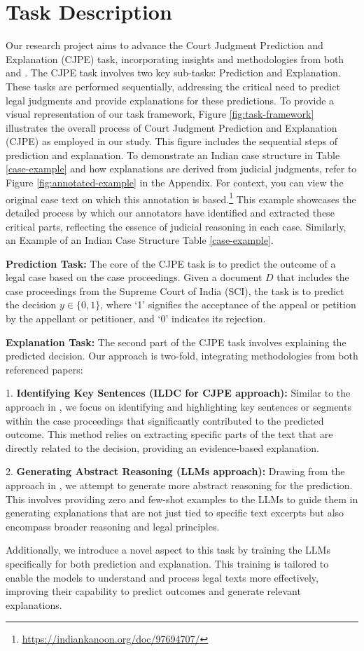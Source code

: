 \section{Task Description}
Our research project aims to advance the Court Judgment Prediction and Explanation (CJPE) task, incorporating insights and methodologies from both \cite{malik-etal-2021-ildc} and \cite{vats-etal-2023-llms}. The CJPE task involves two key sub-tasks: Prediction and Explanation. These tasks are performed sequentially, addressing the critical need to predict legal judgments and provide explanations for these predictions. To provide a visual representation of our task framework, Figure \ref{fig:task-framework} illustrates the overall process of Court Judgment Prediction and Explanation (CJPE) as employed in our study. This figure includes the sequential steps of prediction and explanation. To demonstrate an Indian case structure in Table \ref{case-example} and how explanations are derived from judicial judgments, refer to Figure \ref{fig:annotated-example} in the Appendix. For context, you can view the original case text on which this annotation is based.\footnote{\url{https://indiankanoon.org/doc/97694707/}} This example showcases the detailed process by which our annotators have identified and extracted these critical parts, reflecting the essence of judicial reasoning in each case. Similarly, an Example of an Indian Case Structure Table \ref{case-example}.

\textbf{Prediction Task:} The core of the CJPE task is to predict the outcome of a legal case based on the case proceedings. Given a document \(D\) that includes the case proceedings from the Supreme Court of India (SCI), the task is to predict the decision \(y \in \{0, 1\}\), where `1' signifies the acceptance of the appeal or petition by the appellant or petitioner, and `0' indicates its rejection.

\textbf{Explanation Task:} The second part of the CJPE task involves explaining the predicted decision. Our approach is two-fold, integrating methodologies from both referenced papers:

1. \textbf{Identifying Key Sentences (ILDC for CJPE approach):} Similar to the approach in \cite{malik-etal-2021-ildc}, we focus on identifying and highlighting key sentences or segments within the case proceedings that significantly contributed to the predicted outcome. This method relies on extracting specific parts of the text that are directly related to the decision, providing an evidence-based explanation.

2. \textbf{Generating Abstract Reasoning (LLMs approach):} Drawing from the approach in \cite{vats-etal-2023-llms}, we attempt to generate more abstract reasoning for the prediction. This involves providing zero and few-shot examples to the LLMs to guide them in generating explanations that are not just tied to specific text excerpts but also encompass broader reasoning and legal principles.

Additionally, we introduce a novel aspect to this task by training the LLMs specifically for both prediction and explanation. This training is tailored to enable the models to understand and process legal texts more effectively, improving their capability to predict outcomes and generate relevant explanations.
